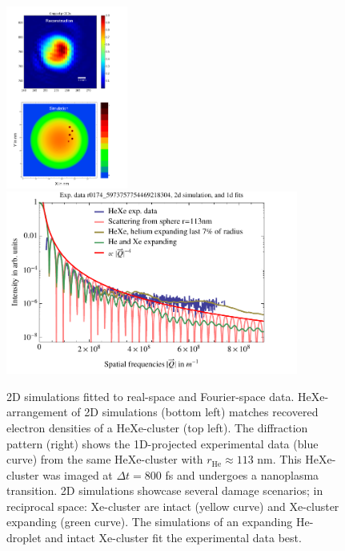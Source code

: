 \begin{figure}
	\centering
		\includegraphics[height=6.0cm]{images/results/HeXe-densities-113-05-doping-and-reconstruction.png}
		\includegraphics[height=6.0cm]{images/results/HeXe-cluster-113-0-5-doping2.pdf}
	\caption[Simulation and exp. data: Structural damage in He-droplet.]{2D simulations fitted to real-space and Fourier-space data. HeXe-arrangement of 2D simulations (bottom left) matches recovered electron densities of a HeXe-cluster (top left). The diffraction pattern (right) shows the 1D-projected experimental data (blue curve) from the same HeXe-cluster with $r_{\text{He}}\approx 113$ nm. This HeXe-cluster was imaged at $\Delta t=800$ fs and undergoes a nanoplasma transition. 2D simulations showcase several damage scenarios; in reciprocal space: Xe-cluster are intact (yellow curve) and Xe-cluster expanding (green curve). The simulations of an expanding He-droplet and intact Xe-cluster fit the experimental data best.}
	\label{fig:HeXe-cluster-113-0.5}
\end{figure}
